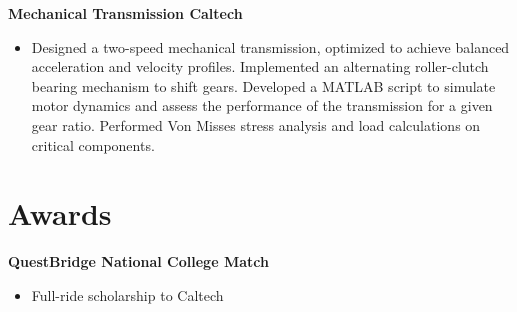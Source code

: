\documentclass[11pt,a4paper]{article}
\begin{document}
\noindent\textbf{Mechanical Transmission \textbar{} Caltech}
\begin{itemize}[leftmargin=1.2em, itemsep=0.2pt, topsep=0.4pt]
    \item Designed a two-speed mechanical transmission, optimized to achieve balanced acceleration and velocity profiles. Implemented an alternating roller-clutch bearing mechanism to shift gears. Developed a MATLAB script to simulate motor dynamics and assess the performance of the transmission for a given gear ratio. Performed Von Misses stress analysis and load calculations on critical components. 
\end{itemize}

\section*{Awards}
\noindent\textbf{QuestBridge National College Match}
\begin{itemize}[leftmargin=1.2em, itemsep=0.2pt, topsep=0.4pt, after=\vspace{4pt}]
    \item Full-ride scholarship to Caltech
\end{itemize}
\end{document}
